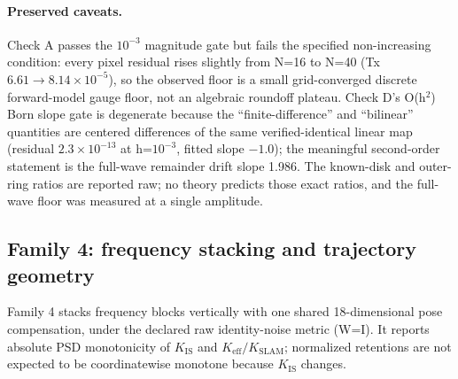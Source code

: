 \documentclass[12pt]{article}
\begin{document}
\paragraph{Preserved caveats.} Check A passes the $10^{-3}$ magnitude gate but
fails the specified non-increasing condition: every pixel residual rises
slightly from N=16 to N=40 (Tx $6.61\to8.14\times10^{-5}$), so the observed
floor is a small grid-converged discrete forward-model gauge floor, not an
algebraic roundoff plateau. Check D's O(h$^2$) Born slope gate is degenerate
because the ``finite-difference'' and ``bilinear'' quantities are centered
differences of the same verified-identical linear map (residual
$2.3\times10^{-13}$ at h=$10^{-3}$, fitted slope $-1.0$); the meaningful
second-order statement is the full-wave remainder drift slope 1.986. The
known-disk and outer-ring ratios are reported raw; no theory predicts those
exact ratios, and the full-wave floor was measured at a single amplitude.

\subsection{Family 4: frequency stacking and trajectory geometry}\label{sec:family4}

Family 4 stacks frequency blocks vertically with one shared 18-dimensional
pose compensation, under the declared raw identity-noise metric (W=I). It
reports absolute PSD monotonicity of $K_{\mathrm{IS}}$ and
$K_{\mathrm{eff}}/K_{\mathrm{SLAM}}$; normalized retentions are not expected
to be coordinatewise monotone because $K_{\mathrm{IS}}$ changes.
\end{document}
